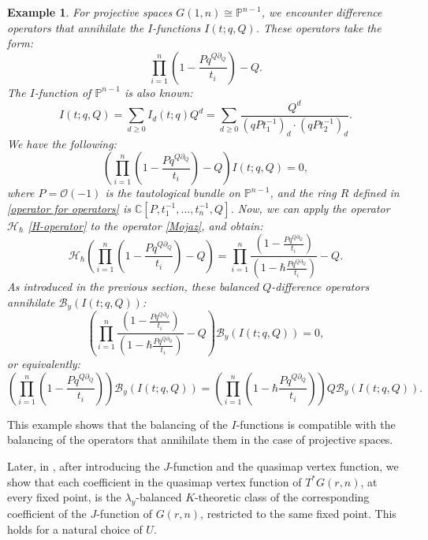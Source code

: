 \documentclass{amsart}
\newtheorem{example}[thm]{Example}
\begin{document}
       \begin{example}\label{Balancing of operators for projective space}
           For projective spaces $G(1,n) \cong \mathbb{P}^{n-1}$, we encounter difference operators that annihilate the  $I$-functions $I(t;q,Q)$.  These operators take the form:
        \begin{equation} \label{Mojaz}
        \prod_{i=1}^{n}(1-\frac{Pq^{Q\partial_Q}}{t_i}) - Q.
        \end{equation}
        The $I$-function of $\mathbb{P}^{n-1}$ is also known:
        \[
 I(t;q,Q)=\sum_{d \geq 0}I_d(t;q)Q^d=\sum_{d \geq 0}\frac{Q^d}{(qPt_1^{-1})_d\cdot(qPt_2^{-1})_d}.
 \]
 We have the following:
        \[
        \left(\prod_{i=1}^{n}(1-\frac{Pq^{Q\partial_Q}}{t_i}) - Q\right)I(t;q,Q) = 0,
        \]
        where $P = \mathcal{O}(-1)$ is the tautological bundle on $\mathbb{P}^{n-1}$, and the ring $R$ defined in \cref{operator for operators} is $\mathbb{C}[P,t_1^{-1},\dots,t_n^{-1},Q]$.
Now, we can apply the operator $\mathcal{H}_{\hbar}$ \eqref{H-operator} to the operator \eqref{Mojaz}, and obtain:
        \[
        \mathcal{H}_{\hbar}\left(\prod_{i=1}^n(1-\frac{Pq^{Q\partial_Q}}{t_i})-Q\right) = \prod_{i=1}^n\frac{(1-\frac{Pq^{Q\partial_Q}}{t_i})}{(1-\hbar\frac{Pq^{Q\partial_Q}}{t_i})}-Q.
        \]
        As introduced in the previous section, these balanced $Q$-difference operators annihilate $\mathcal{B}_y\left(I(t;q,Q)\right)$:
        \[
        \left(\prod_{i=1}^{n}\frac{(1-\frac{Pq^{Q\partial_Q}}{t_i})}{(1-\hbar\frac{Pq^{Q\partial_Q}}{t_i})}-Q\right)\mathcal{B}_y\left(I(t;q,Q)\right)=0,
        \]
        or equivalently:
        \[
        \left(\prod_{i=1}^{n}(1-\frac{Pq^{Q\partial_Q}}{t_i}) \right)\mathcal{B}_y\left(I(t;q,Q)\right) = \left(\prod_{i=1}^{n}(1-\hbar\frac{Pq^{Q\partial_Q}}{t_i})\right)Q\mathcal{B}_y\left(I(t;q,Q)\right).
        \]
       \end{example}
        This example shows that the balancing of the $I$-functions is compatible with the balancing of the operators that annihilate them in the case of projective spaces.
        


Later, in , after introducing the $J$-function and the quasimap vertex function, we show that each coefficient in the quasimap vertex function of $T^*G(r,n)$, at every fixed point, is the  $\lambda_y$-balanced $K$-theoretic class of the corresponding coefficient of the
$J$-function of $G(r,n)$, restricted to the same fixed point. This holds for a natural choice of $U$.
\end{document}
